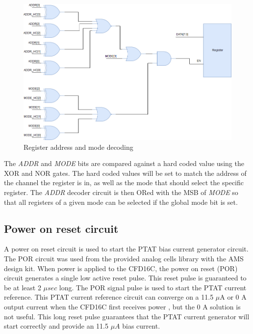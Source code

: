\documentclass[12pt,oneside,final]{siuethesis}
\theoremstyle{definition}
\begin{document}
\begin{figure}[htbp!]
 \centering
 \includegraphics[scale=.45,keepaspectratio=true]{./ch3_figures/Register.png}
 \caption{Register address and mode decoding}
 \label{fig:register}
\end{figure}

\par The \emph{ADDR} and \emph{MODE} bits are compared against a hard coded value using the XOR and NOR gates. The hard coded values will be set to match the address of the channel the register is in, as well as the mode that should select the specific register. The \emph{ADDR} decoder circuit is then ORed with the MSB of \emph{MODE} so that all registers of a given mode can be selected if the global mode bit is set.

\subsection{Power on reset circuit}
\par A power on reset circuit is used to start the PTAT bias current generator circuit. The POR circuit was used from the provided analog cells library with the AMS design kit. When power is applied to the CFD16C, the power on reset (POR) circuit generates a single low active reset pulse. This reset pulse is guaranteed to be at least 2 $\mu sec$ long. The POR signal pulse is used to start the PTAT current reference. This PTAT current reference circuit can converge on a 11.5 $\mu$A or 0 A output current when the CFD16C first receives power \cite{ALAN_BOOK}, but the 0 A solution is not useful. This long reset pulse guarantees that the PTAT current generator will start correctly and provide an 11.5 $\mu A$ bias current.
\end{document}
